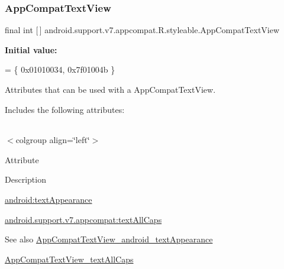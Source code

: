 \subsubsection{\texorpdfstring{App\+Compat\+Text\+View}{AppCompatTextView}}
{\footnotesize\ttfamily final int \mbox{[}$\,$\mbox{]} android.\+support.\+v7.\+appcompat.\+R.\+styleable.\+App\+Compat\+Text\+View\hspace{0.3cm}{\ttfamily [static]}}

{\bfseries Initial value\+:}
\begin{DoxyCode}
= \{
            0x01010034, 0x7f01004b
        \}
\end{DoxyCode}
Attributes that can be used with a App\+Compat\+Text\+View. 

Includes the following attributes\+:

\tabulinesep=1mm
\begin{longtabu} spread 0pt [c]{*{0}{|X[-1]}|}
\hline
\end{longtabu}
$<$colgroup align=\char`\"{}left\char`\"{}$>$ 

Attribute

Description 

{\ttfamily \hyperlink{classandroid_1_1support_1_1v7_1_1appcompat_1_1R_1_1styleable_af764a0698a230cd1f1682eacbc17ddfc}{android\+:text\+Appearance}}

{\ttfamily \hyperlink{classandroid_1_1support_1_1v7_1_1appcompat_1_1R_1_1styleable_a991a7f424270ded62fc81772e1855c97}{android.\+support.\+v7.\+appcompat\+:text\+All\+Caps}}

\begin{DoxySeeAlso}{See also}
\hyperlink{classandroid_1_1support_1_1v7_1_1appcompat_1_1R_1_1styleable_af764a0698a230cd1f1682eacbc17ddfc}{App\+Compat\+Text\+View\+\_\+android\+\_\+text\+Appearance} 

\hyperlink{classandroid_1_1support_1_1v7_1_1appcompat_1_1R_1_1styleable_a991a7f424270ded62fc81772e1855c97}{App\+Compat\+Text\+View\+\_\+text\+All\+Caps} 
\end{DoxySeeAlso}
\mbox{\label{classandroid_1_1support_1_1v7_1_1appcompat_1_1R_1_1styleable_af764a0698a230cd1f1682eacbc17ddfc}} 
